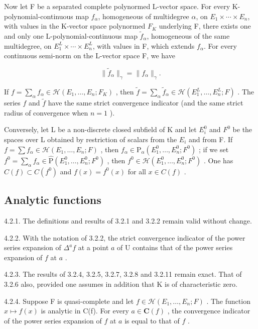 Now let F be a separated complete polynormed L-vector space. For every K-polynomial-continuous map \(f_{\alpha}\), homogeneous of multidegree \(\alpha\), on \(E_1 \times \cdots \times E_n\), with values in the K-vector space polynormed \(F_K\) underlying F, there exists one and only one L-polynomial-continuous map \(\tilde{f}_{\alpha}\), homogeneous of the same multidegree, on \(E_1^L \times \cdots \times E_n^L\), with values in F, which extends \(f_{\alpha}\). For every continuous semi-norm on the L-vector space F, we have

\[
\| \tilde {f} _ {\alpha} \| _ {\gamma} = \| f _ {\alpha} \| _ {\gamma}.
\]

If \(f = \sum_{\alpha} f_{\alpha} \in \mathcal{H}(E_1, \ldots, E_n; F_K)\) , then \(\tilde{f} = \sum_{\alpha} \tilde{f}_{\alpha} \in \mathcal{H}(E_1^L, \ldots, E_n^L; F)\) . The series \(f\) and \(\tilde{f}\) have the same strict convergence indicator (and the same strict radius of convergence when \(n = 1\) ).

Conversely, let L be a non-discrete closed subfield of K and let \(E_{i}^{0}\) and \(F^{0}\) be the spaces over L obtained by restriction of scalars from the \(E_{i}\) and from F. If \(f = \sum f_{\alpha} \in \mathcal{H}(E_{1}, \ldots, E_{n}; F)\) , then \(f_{\alpha} \in \mathrm{P}_{\alpha}(E_{1}^{0}, \ldots, E_{n}^{0}; F^{0})\) ; if we set \(f^{0} = \sum_{\alpha} f_{\alpha} \in \hat{\mathrm{P}}(E_{1}^{0}, \ldots, E_{n}^{0}; F^{0})\) , then \(f^{0} \in \mathcal{H}(E_{1}^{0}, \ldots, E_{n}^{0}; F^{0})\) . One has \(C(f) \subset C(f^{0})\) and \(f(x) = f^{0}(x)\) for all \(x \in C(f)\) .

\subsection{Analytic functions}

4.2.1. The definitions and results of 3.2.1 and 3.2.2 remain valid without change.

4.2.2. With the notation of 3.2.2, the strict convergence indicator of the power series expansion of \(\Delta^{a}f\) at a point \(a\) of U contains that of the power series expansion of \(f\) at \(a\) .

4.2.3. The results of 3.2.4, 3.2.5, 3.2.7, 3.2.8 and 3.2.11 remain exact. That of 3.2.6 also, provided one assumes in addition that K is of characteristic zero.



4.2.4. Suppose F is quasi-complete and let \(f\in\mathcal{H}(E_{1},\ldots,E_{n};F)\) . The function \(x\mapsto f(x)\) is analytic in C(f). For every \(a\in\mathbf{C}(f)\) , the convergence indicator of the power series expansion of \(f\) at \(a\) is equal to that of \(f\) .

